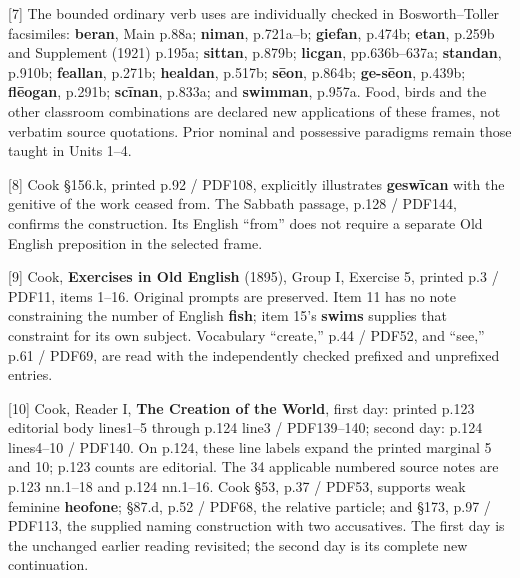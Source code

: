 [7] The bounded ordinary verb uses are individually checked in Bosworth–Toller facsimiles: \textbf{beran}, Main p.88a; \textbf{niman}, p.721a–b; \textbf{giefan}, p.474b; \textbf{etan}, p.259b and Supplement (1921) p.195a; \textbf{sittan}, p.879b; \textbf{licgan}, pp.636b–637a; \textbf{standan}, p.910b; \textbf{feallan}, p.271b; \textbf{healdan}, p.517b; \textbf{sēon}, p.864b; \textbf{ge-sēon}, p.439b; \textbf{flēogan}, p.291b; \textbf{scīnan}, p.833a; and \textbf{swimman}, p.957a. Food, birds and the other classroom combinations are declared new applications of these frames, not verbatim source quotations. Prior nominal and possessive paradigms remain those taught in Units 1–4.

[8] Cook §156.k, printed p.92 /\allowbreak{} PDF108, explicitly illustrates \textbf{geswīcan} with the genitive of the work ceased from. The Sabbath passage, p.128 /\allowbreak{} PDF144, confirms the construction. Its English “from” does not require a separate Old English preposition in the selected frame.

[9] Cook, \textbf{Exercises in Old English} (1895), Group I, Exercise 5, printed p.3 /\allowbreak{} PDF11, items 1–16. Original prompts are preserved. Item 11 has no note constraining the number of English \textbf{fish}; item 15's \textbf{swims} supplies that constraint for its own subject. Vocabulary “create,” p.44 /\allowbreak{} PDF52, and “see,” p.61 /\allowbreak{} PDF69, are read with the independently checked prefixed and unprefixed entries.

[10] Cook, Reader I, \textbf{The Creation of the World}, first day: printed p.123 editorial body lines1–5 through p.124 line3 /\allowbreak{} PDF139–140; second day: p.124 lines4–10 /\allowbreak{} PDF140. On p.124, these line labels expand the printed marginal 5 and 10; p.123 counts are editorial. The 34 applicable numbered source notes are p.123 nn.1–18 and p.124 nn.1–16. Cook §53, p.37 /\allowbreak{} PDF53, supports weak feminine \textbf{heofone}; §87.d, p.52 /\allowbreak{} PDF68, the relative particle; and §173, p.97 /\allowbreak{} PDF113, the supplied naming construction with two accusatives. The first day is the unchanged earlier reading revisited; the second day is its complete new continuation.

\endgroup

